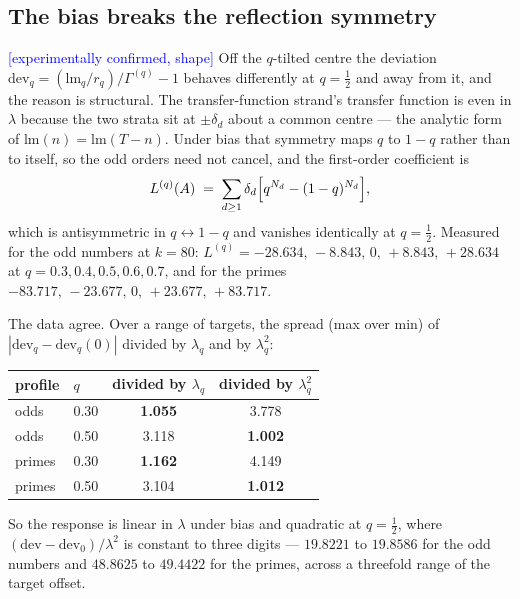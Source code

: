 \documentclass[11pt,a4paper]{article}
\theoremstyle{plain}
\theoremstyle{definition}
\theoremstyle{remark}
\newcommand{\lm}{\mathrm{lm}}
\newcommand{\STATUS}[1]{\textcolor{blue}{\textsf{[#1]}}}
\begin{document}
\subsection{The bias breaks the reflection symmetry}\label{sec:e6}

\STATUS{experimentally confirmed, shape} Off the $q$-tilted centre the deviation
$\mathrm{dev}_q=(\lm_q/r_q)/\Gamma^{(q)}-1$ behaves differently at $q=\tfrac12$ and away
from it, and the reason is structural. The transfer-function strand's transfer function is even in $\lambda$
because the two strata sit at $\pm\delta_d$ about a common centre --- the analytic form of
$\lm(n)=\lm(T-n)$. Under bias that symmetry maps $q$ to $1-q$ rather than to itself, so the
odd orders need not cancel, and the first-order coefficient is
\[
  L^{(q)}(A)\;=\;\sum_{d\ge1}\delta_d\Bigl[q^{N_d}-(1-q)^{N_d}\Bigr],
\]
which is antisymmetric in $q\leftrightarrow1-q$ and vanishes identically at $q=\tfrac12$.
Measured for the odd numbers at $k=80$: $L^{(q)}=-28.634,\,-8.843,\,0,\,+8.843,\,+28.634$ at
$q=0.3,0.4,0.5,0.6,0.7$, and for the primes $-83.717,\,-23.677,\,0,\,+23.677,\,+83.717$.

The data agree. Over a range of targets, the spread (max over min) of
$|\mathrm{dev}_q-\mathrm{dev}_q(0)|$ divided by $\lambda_q$ and by $\lambda_q^2$:

\begin{center}
\begin{tabular}{llcc}
\toprule
profile & $q$ & divided by $\lambda_q$ & divided by $\lambda_q^{2}$\\
\midrule
odds & 0.30 & \textbf{1.055} & 3.778\\
odds & 0.50 & 3.118 & \textbf{1.002}\\
primes & 0.30 & \textbf{1.162} & 4.149\\
primes & 0.50 & 3.104 & \textbf{1.012}\\
\bottomrule
\end{tabular}
\end{center}

\noindent
So the response is linear in $\lambda$ under bias and quadratic at $q=\tfrac12$, where
$(\mathrm{dev}-\mathrm{dev}_0)/\lambda^{2}$ is constant to three digits --- $19.8221$ to
$19.8586$ for the odd numbers and $48.8625$ to $49.4422$ for the primes, across a threefold
range of the target offset.
\end{document}
